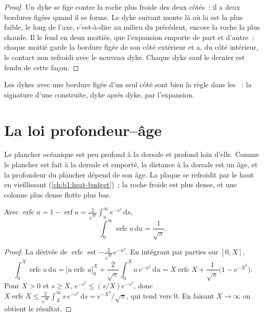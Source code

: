 \begin{proof}
Un dyke se fige contre la roche plus froide des deux côtés~: il a deux bordures
figées quand il se forme. Le dyke suivant monte là où la  est la plus faible, le long de
l'axe, c'est-à-dire au milieu du précédent, encore la roche la plus chaude. Il
le fend en deux moitiés, que l'expansion emporte de part et d'autre~; chaque moitié garde la bordure figée
de son côté extérieur et a, du côté intérieur, le contact non refroidi
avec le nouveau dyke. Chaque dyke sauf le dernier est fendu de cette
façon.
\end{proof}

Les dykes avec une bordure figée d'un seul côté sont bien la règle dans les ~:
la signature d'une  construite, dyke après dyke, par
l'expansion.


\section{La loi profondeur--âge}\label{sec:b1:rifts-ridges-margins:depth-age}

Le plancher océanique est peu profond à la dorsale et profond loin d'elle. Comme le plancher est fait
à la dorsale et emporté, la distance à la dorsale est un âge, et la profondeur du
plancher dépend de son âge. La plaque se refroidit par le haut en vieillissant
(\cref{ch:b1:heat-budget})~; la roche froide est plus dense, et une colonne plus dense flotte
plus bas.

\begin{lemma}\label{lem:b1:rifts-ridges-margins:erfc}
Avec $\operatorname{erfc} u = 1 - \operatorname{erf} u =
\frac{2}{\sqrt\pi}\int_u^\infty e^{-s^2}\,\mathrm ds$,
\[
  \int_0^\infty \operatorname{erfc} u \,\mathrm du = \frac{1}{\sqrt\pi}.
\]
\end{lemma}

\begin{proof}
La dérivée de $\operatorname{erfc}$ est $-\frac{2}{\sqrt\pi}e^{-u^2}$.
En intégrant par parties sur $[0, X]$,
\[
  \int_0^X \operatorname{erfc} u\,\mathrm du
  = \bigl[u \operatorname{erfc} u\bigr]_0^X + \frac{2}{\sqrt\pi}\int_0^X u\,e^{-u^2}\,\mathrm du
  = X\operatorname{erfc} X + \frac{1}{\sqrt\pi}\bigl(1 - e^{-X^2}\bigr).
\]
Pour $X > 0$ et $s \ge X$, $e^{-s^2} \le (s/X)e^{-s^2}$, donc
$X\operatorname{erfc} X \le \frac{2}{\sqrt\pi}\int_X^\infty s\,e^{-s^2}\,\mathrm ds
= e^{-X^2}/\sqrt\pi$, qui tend vers 0. En faisant $X \to \infty$ on obtient le
résultat.
\end{proof}

